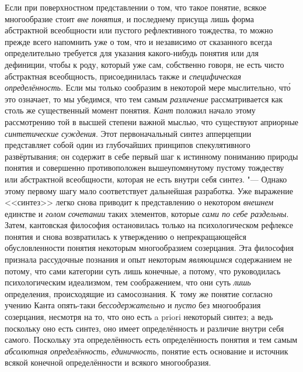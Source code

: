 Если при поверхностном представлении о том, что такое понятие,
всякое многообразие стоит {\em вне
понятия,} и последнему присуща лишь форма абстрактной
всеобщности или пустого рефлективного тождества, то можно прежде всего
напомнить уже о том, что и независимо от сказанного всегда определительно
требуется для указания какого-нибудь понятия или для
дефиниции, чтобы к роду, который уже сам, собственно говоря, не есть чисто
абстрактная всеобщность, присоединилась также и
{\em специфическая определённость}.
Если мы только сообразим в некоторой мере мыслительно, чт\'{о}
это означает, то мы убедимся, что тем самым
{\em различение}
рассматривается как столь же существенный момент понятия.
{\em Кант} положил начало
этому рассмотрению той в высшей степени важной мыслью, что существуют
априорные {\em синтетические суждения}.
Этот первоначальный синтез апперцепции представляет собой
один из глубочайших принципов спекулятивного развёртывания; он содержит в
себе первый шаг к истинному пониманию природы понятия и совершенно
противоположен вышеупомянутому пустому тождеству или абстрактной
всеобщности, которая не есть внутри себя синтез. "--- Однако
этому первому шагу мало соответствует дальнейшая разработка. Уже выражение
<<синтез>> легко снова приводит к представлению о некотором
{\em внешнем} единстве и {\em голом сочетании} таких элементов, которые
{\em сами по себе раздельны}.
Затем, кантовская философия остановилась только на
психологическом рефлексе понятия и снова возвратилась к утверждению о
непрекращающейся обусловленности понятия некоторым многообразием
созерцания. Эта философия признала рассудочные познания и опыт некоторым
{\em являющимся}
содержанием не потому, что сами категории суть лишь конечные,
а потому, что руководилась психологическим идеализмом, тем соображением,
что они суть {\em лишь}
определения, происходящие из самосознания. К~тому же понятие
согласно учению Канта опять-таки
{\em бессодержательно} и
{\em пусто} без
многообразия созерцания, несмотря на то, что оно есть a priori
некоторый синтез; а ведь поскольку оно есть синтез, оно имеет
определённость и различие внутри себя самого. Поскольку эта определённость
есть определённость понятия и тем самым
{\em абсолютная определённость,}
{\em единичность,} понятие
есть основание и источник всякой конечной определённости и всякого
многообразия.

